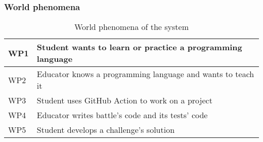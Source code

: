 \subsubsection{World phenomena}
\begin{table}[h]
    \centering
    \begin{tabular}{|l|l|}
        \hline
        WP1 & Student wants to learn or practice a programming language \\
        \hline
        WP2 & Educator knows a programming language and wants to teach it \\
        \hline
        WP3 & Student uses GitHub Action to work on a project \\
        \hline
        WP4 & Educator writes battle's code and its tests' code \\
        \hline
        WP5 & Student develops a challenge's solution \\
        \hline
    \end{tabular}
    \caption{World phenomena of the system}
    \label{tab:goals}
\end{table}

